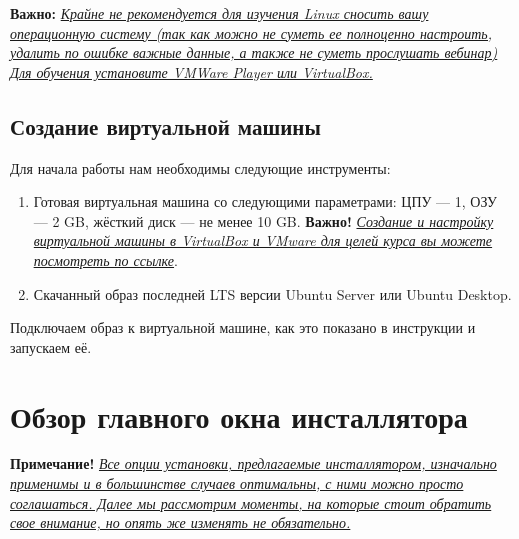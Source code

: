 \documentclass[14pt, a4paper]{article}
\begin{document}
\textbf{Важно:} \textit{\uline{Крайне не рекомендуется для изучения Linux сносить вашу операционную систему
(так как можно не суметь ее полноценно на\-строить, удалить по ошибке важные данные, а также
не суметь прослу\-шать вебинар) Для обучения установите VMWare Player или VirtualBox.}}

\subsection*{Создание виртуальной машины}

Для начала работы нам необходимы следующие инструменты:

\begin{enumerate}
    \item Готовая виртуальная машина со следующими параметрами: ЦПУ — 1, ОЗУ — 2 GB, жёсткий
    диск — не менее 10 GB. \textbf{Важно!} \textit{\uline{Создание и настройку виртуальной машины в VirtualBox и
    VMware для целей курса вы можете \href{https://docs.google.com/presentation/d/1142W3Wj-WKgfZX0TrA78y17ofYg-OYV_ljYhe79wMcU/edit}{посмотреть по ссылке}}}.
    \item Скачанный образ последней LTS версии Ubuntu Server или Ubuntu Desktop.
\end{enumerate}

Подключаем образ к виртуальной машине, как это показано в инструкции и запускаем её.



\section*{Обзор главного окна инсталлятора}
\textbf{Примечание!} \textit{\uline{Все опции установки, предлагаемые инсталлятором, из\-на\-чально применимы
и в большинстве случаев оптимальны, с ними можно просто соглашаться. Далее мы рассмотрим
моменты, на ко\-то\-рые стоит обратить свое внимание, но опять же изменять не обя\-за\-тель\-но.}}
\end{document}
